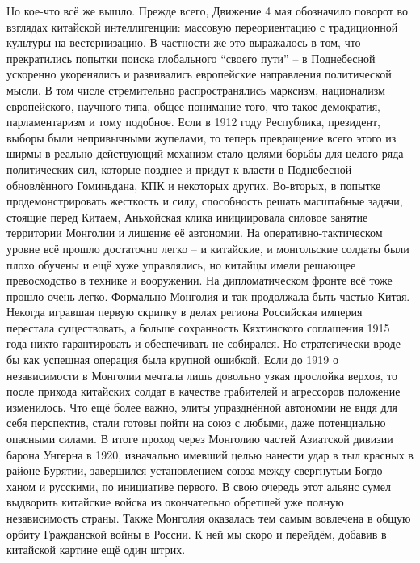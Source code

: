 Но кое-что всё же вышло. Прежде всего, Движение 4 мая обозначило поворот во взглядах китайской интеллигенции: массовую переориентацию с традиционной культуры на вестернизацию. В частности же это выражалось в том, что прекратились попытки поиска глобального “своего пути” – в Поднебесной ускоренно укоренялись и развивались европейские направления политической мысли. В том числе стремительно распространялись марксизм, национализм европейского, научного типа, общее понимание того, что такое демократия, парламентаризм и тому подобное. Если в 1912 году Республика, президент, выборы были непривычными жупелами, то теперь превращение всего этого из ширмы в реально действующий механизм стало целями борьбы для целого ряда политических сил, которые позднее и придут к власти в Поднебесной – обновлённого Гоминьдана, КПК и некоторых других. Во-вторых, в попытке продемонстрировать жесткость и силу, способность решать масштабные задачи, стоящие перед Китаем, Аньхойская клика инициировала силовое занятие территории Монголии и лишение её автономии. На оперативно-тактическом уровне всё прошло достаточно легко – и китайские, и монгольские солдаты были плохо обучены и ещё хуже управлялись, но китайцы имели решающее превосходство в технике и вооружении. На дипломатическом фронте всё тоже прошло очень легко. Формально Монголия и так продолжала быть частью Китая. Некогда игравшая первую скрипку в делах региона Российская империя перестала существовать, а больше сохранность Кяхтинского соглашения 1915 года никто гарантировать и обеспечивать не собирался. Но стратегически вроде бы как успешная операция была крупной ошибкой. Если до 1919 о независимости в Монголии мечтала лишь довольно узкая прослойка верхов, то после прихода китайских солдат в качестве грабителей и агрессоров положение изменилось. Что ещё более важно, элиты упразднённой автономии не видя для себя перспектив, стали готовы пойти на союз с любыми, даже потенциально опасными силами. В итоге проход через Монголию частей Азиатской дивизии барона Унгерна в 1920, изначально имевший целью нанести удар в тыл красных в районе Бурятии, завершился установлением союза между свергнутым Богдо-ханом и русскими, по инициативе первого. В свою очередь этот альянс сумел выдворить китайские войска из окончательно обретшей уже полную независимость страны. Также Монголия оказалась тем самым вовлечена в общую орбиту Гражданской войны в России. К ней мы скоро и перейдём, добавив в китайской картине ещё один штрих.

